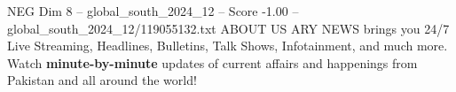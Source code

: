 \begin{textsample}{NEG Dim 8 – global\_south\_2024\_12 – Score -1.00 – global\_south\_2024\_12/119055132.txt}
ABOUT US ARY NEWS brings you 24/7 Live Streaming, Headlines, Bulletins, Talk Shows, Infotainment, and much more.
Watch \textbf{minute-by-minute} updates of current affairs and happenings from Pakistan and all around the world!

\end{textsample}
